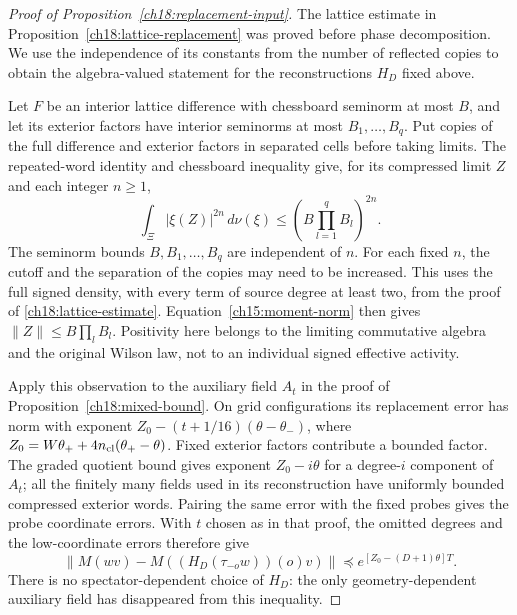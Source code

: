 \begin{proof}[Proof of Proposition~\ref{ch18:replacement-input}]
\label{ch18:raw-replacement}
The lattice estimate in Proposition~\ref{ch18:lattice-replacement}
was proved before phase decomposition. We use the independence of its constants from the
number of reflected copies to obtain the algebra-valued statement for the
reconstructions $H_D$ fixed above.

Let $F$ be an interior lattice difference with chessboard seminorm
at most $B$, and let its exterior factors have interior seminorms
at most $B_1,\ldots,B_q$. Put copies of the full difference
and exterior factors in separated cells before taking limits.
The repeated-word identity and chessboard inequality give, for its
compressed limit $Z$ and each integer $n\ge1$,
\[
 \int_\Xi|\xi(Z)|^{2n}\,d\nu(\xi)
                   \le(B\prod_{l=1}^qB_l)^{2n}.
\]
The seminorm bounds $B,B_1,\ldots,B_q$ are independent of $n$.
For each fixed $n$, the cutoff and the separation of the copies may
need to be increased.
This uses the full signed density, with every term of source degree at least two,
from the proof of \eqref{ch18:lattice-estimate}.
Equation~\eqref{ch15:moment-norm} then gives
$\|Z\|\le B\prod_lB_l$. Positivity here belongs to the limiting
commutative algebra and the original Wilson law, not to an
individual signed effective activity.

Apply this observation to the auxiliary field $A_t$ in the proof
of Proposition~\ref{ch18:mixed-bound}. On grid configurations its
replacement error has norm with exponent
$Z_0-(t+1/16)(\theta-\theta_-)$, where
$Z_0=W\theta_++4n_{\rm cl}(\theta_+-\theta)$.
Fixed exterior factors contribute a bounded factor. The graded quotient
bound gives exponent $Z_0-i\theta$ for a degree-$i$ component of
$A_t$; all the finitely many fields used in its reconstruction
have uniformly bounded compressed exterior words. Pairing the
same error with the fixed probes gives the probe coordinate
errors. With $t$ chosen as in that proof, the omitted degrees
and the low-coordinate errors therefore give
\[
 \|M(wv)-M((H_D(\tau_{-o}w))(o)v)\|
                \preccurlyeq e^{[Z_0-(D+1)\theta]T}.
\]
There is no spectator-dependent choice of $H_D$: the only
geometry-dependent auxiliary field has disappeared from this
inequality.


\end{proof}
